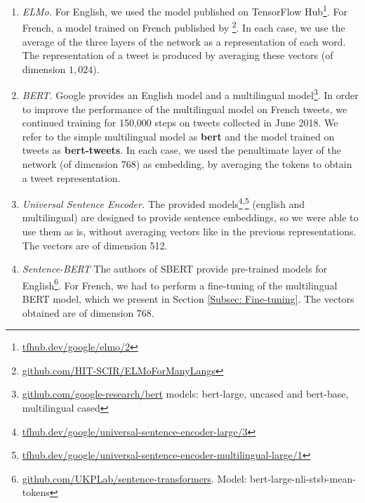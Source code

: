 \begin{enumerate}
\item \textit{ELMo.} For English, we used the model published on TensorFlow Hub\footnote{\url{tfhub.dev/google/elmo/2}}. For French, a model trained on French published by \citet{che2018towards}\footnote{\url{github.com/HIT-SCIR/ELMoForManyLangs}}. In each case, we use the average of the three layers of the network as a representation of each word. The representation of a tweet is produced by averaging these vectors (of dimension $1,024$).


\item \textit{BERT.} Google provides an English model and a multilingual model\footnote{\url{github.com/google-research/bert} models: bert-large, uncased and bert-base, multilingual cased}. In order to improve the performance of the multilingual model on French tweets, we continued training for 150,000 steps on tweets collected in June 2018. We refer to the simple multilingual model as \textbf{bert} and the model trained on tweets as \textbf{bert-tweets}. In each case, we used the penultimate layer of the network (of dimension 768) as embedding, by averaging the tokens to obtain a tweet representation.

\item \textit{Universal Sentence Encoder.} The provided models\footnote{\url{tfhub.dev/google/universal-sentence-encoder-large/3}}\textsuperscript{,}\footnote{\url{tfhub.dev/google/universal-sentence-encoder-multilingual-large/1}}
    (english and multilingual) are designed to provide sentence embeddings, so we were able to use them as is, without averaging vectors
    like in the previous representations. The vectors are of dimension 512.

\item \textit{Sentence-BERT} The authors of SBERT provide pre-trained models for English\footnote{\url{github.com/UKPLab/sentence-transformers}. Model: bert-large-nli-stsb-mean-tokens}. For French, we had to perform a fine-tuning of the multilingual BERT model, which we present in Section \ref{Subsec: Fine-tuning}. The vectors obtained are of dimension 768.
\end{enumerate}



